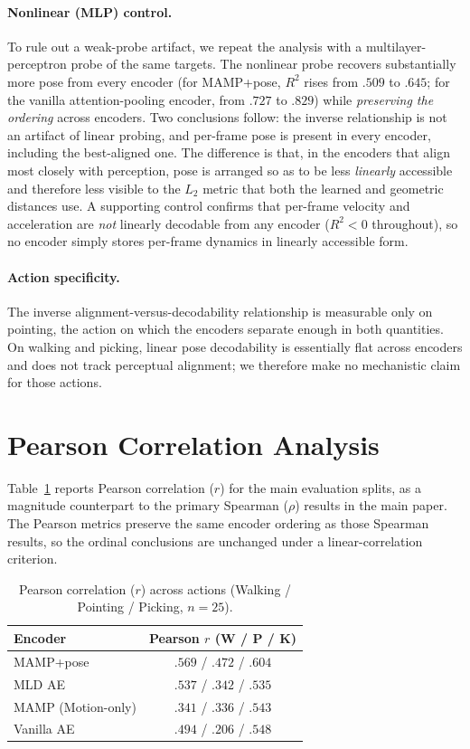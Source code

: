 \documentclass[letterpaper]{article} %
\begin{document}
\paragraph{Nonlinear (MLP) control.}
To rule out a weak-probe artifact, we repeat the analysis with a multilayer-perceptron probe of the
same targets. The nonlinear probe recovers substantially more pose from every encoder (for MAMP+pose,
$R^2$ rises from $.509$ to $.645$; for the vanilla attention-pooling encoder, from $.727$ to $.829$)
while \emph{preserving the ordering} across encoders. Two conclusions follow: the inverse relationship
is not an artifact of linear probing, and per-frame pose is present in every encoder, including the
best-aligned one. The difference is that, in the encoders that align most closely with perception, pose
is arranged so as to be less \emph{linearly} accessible and therefore less visible to the $L_2$ metric
that both the learned and geometric distances use. A supporting control confirms that per-frame
velocity and acceleration are \emph{not} linearly decodable from any encoder ($R^2 < 0$ throughout), so
no encoder simply stores per-frame dynamics in linearly accessible form.

\paragraph{Action specificity.}
The inverse alignment-versus-decodability relationship is measurable only on pointing, the action on
which the encoders separate enough in both quantities. On walking and picking, linear pose decodability
is essentially flat across encoders and does not track perceptual alignment; we therefore make no
mechanistic claim for those actions.

\section{Pearson Correlation Analysis}
\label{app:pearson}
Table~\ref{tab:pearson-supp} reports Pearson correlation ($r$) for the main evaluation splits, as a
magnitude counterpart to the primary Spearman ($\rho$) results in the main paper. The Pearson metrics
preserve the same encoder ordering as those Spearman results, so the ordinal conclusions are unchanged
under a linear-correlation criterion.

\begin{table}[htbp]
\centering
\small
\setlength{\tabcolsep}{5pt}
\caption{Pearson correlation ($r$) across actions (Walking / Pointing / Picking, $n=25$).}
\label{tab:pearson-supp}
\begin{tabular}{lc}
\toprule
Encoder & Pearson $r$ (W / P / K) \\
\midrule
MAMP+pose & $.569$ / $.472$ / $.604$ \\
MLD AE & $.537$ / $.342$ / $.535$ \\
MAMP (Motion-only) & $.341$ / $.336$ / $.543$ \\
Vanilla AE & $.494$ / $.206$ / $.548$ \\
\bottomrule
\end{tabular}
\end{table}
\end{document}

